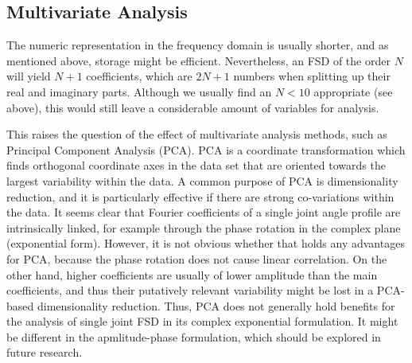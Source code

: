 \documentclass[10pt,a4paper]{article}
\begin{document}
\subsection{Multivariate Analysis}
\label{sec:org10cf092}
The numeric representation in the frequency domain is usually shorter, and as mentioned above, storage might be efficient.
Nevertheless, an FSD of the order \(N\) will yield \(N+1\) coefficients, which are \(2N+1\) numbers when splitting up their real and imaginary parts.
Although we usually find an \(N<10\) appropriate (see above), this would still leave a considerable amount of variables for analysis.

This raises the question of the effect of multivariate analysis methods, such as Principal Component Analysis (PCA).
PCA is a coordinate transformation which finds orthogonal coordinate axes in the data set that are oriented towards the largest variability within the data.
A common purpose of PCA is dimensionality reduction, and it is particularly effective if there are strong co-variations within the data.
It seems clear that Fourier coefficients of a single joint angle profile are intrinsically linked, for example through the phase rotation in the complex plane (exponential form).
However, it is not obvious whether that holds any advantages for PCA, because the phase rotation does not cause linear correlation.
On the other hand, higher coefficients are usually of lower amplitude than the main coefficients, and thus their putatively relevant variability might be lost in a PCA-based dimensionality reduction.
Thus, PCA does not generally hold benefits for the analysis of single joint FSD in its complex exponential formulation.
It might be different in the apmlitude-phase formulation, which should be explored in future research.
\end{document}

